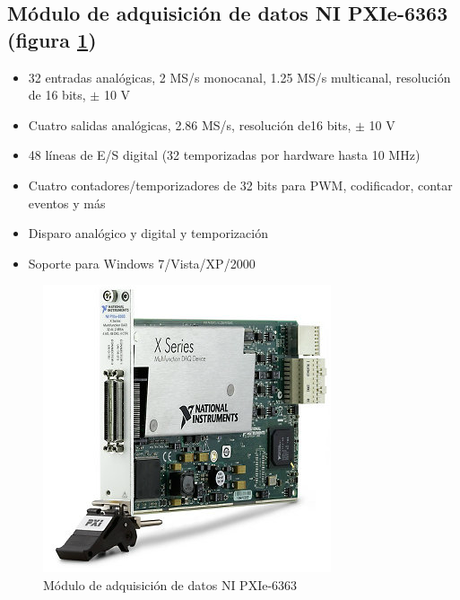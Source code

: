 





\subsection*{Módulo de adquisición de datos NI PXIe-6363 (figura \ref{fig:daq})}

\begin{itemize}
\item 32 entradas analógicas, 2 MS/s monocanal, 1.25 MS/s multicanal, resolución de 16 bits, $\pm$ 10 V
\item Cuatro salidas analógicas, 2.86 MS/s, resolución de16 bits, $\pm$ 10 V
\item 48 líneas de E/S digital (32 temporizadas por hardware hasta 10 MHz)
\item Cuatro contadores/temporizadores de 32 bits para PWM, codificador, contar eventos y más
\item Disparo analógico y digital y temporización 
\item Soporte para Windows 7/Vista/XP/2000
\end{itemize}



\begin{figure}[htb!]
\centering
\includegraphics[scale=0.5]{FiguresP/pxi6363}
\caption{Módulo de adquisición de datos NI PXIe-6363}
\label{fig:daq}
\end{figure}


